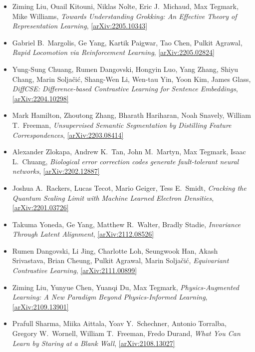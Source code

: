 \begin{itemize}
\item Ziming Liu, Ouail Kitouni, Niklas Nolte, Eric J.\  Michaud, Max Tegmark, Mike Williams, \textit{Towards Understanding Grokking: An Effective Theory of Representation Learning}, \href{https://arxiv.org/abs/2205.10343}{[arXiv:2205.10343]} 
\item Gabriel B.\  Margolis, Ge Yang, Kartik Paigwar, Tao Chen, Pulkit Agrawal, \textit{Rapid Locomotion via Reinforcement Learning}, \href{https://arxiv.org/abs/2205.02824}{[arXiv:2205.02824]} 
\item Yung-Sung Chuang, Rumen Dangovski, Hongyin Luo, Yang Zhang, Shiyu Chang, Marin Soljačić, Shang-Wen Li, Wen-tau Yin, Yoon Kim, James Glass, \textit{DiffCSE: Difference-based Contrastive Learning for Sentence Embeddings}, \href{https://arxiv.org/abs/2204.10298}{[arXiv:2204.10298]} 
\item Mark Hamilton, Zhoutong Zhang, Bharath Hariharan, Noah Snavely, William T.\  Freeman, \textit{Unsupervised Semantic Segmentation by Distilling Feature Correspondences}, \href{https://arxiv.org/abs/2203.08414}{[arXiv:2203.08414]} 
\item Alexander Zlokapa, Andrew K.\  Tan, John M.\  Martyn, Max Tegmark, Isaac L.\  Chuang, \textit{Biological error correction codes generate fault-tolerant neural networks}, \href{https://arxiv.org/abs/2202.12887}{[arXiv:2202.12887]} 
\item Joshua A.\  Rackers, Lucas Tecot, Mario Geiger, Tess E.\  Smidt, \textit{Cracking the Quantum Scaling Limit with Machine Learned Electron Densities}, \href{https://arxiv.org/abs/2201.03726}{[arXiv:2201.03726]} 
\item Takuma Yoneda, Ge Yang, Matthew R.\  Walter, Bradly Stadie, \textit{Invariance Through Latent Alignment}, \href{https://arxiv.org/abs/2112.08526}{[arXiv:2112.08526]} 
\item Rumen Dangovski, Li Jing, Charlotte Loh, Seungwook Han, Akash Srivastava, Brian Cheung, Pulkit Agrawal, Marin Soljačić, \textit{Equivariant Contrastive Learning}, \href{https://arxiv.org/abs/2111.00899}{[arXiv:2111.00899]} 
\item Ziming Liu, Yunyue Chen, Yuanqi Du, Max Tegmark, \textit{Physics-Augmented Learning: A New Paradigm Beyond Physics-Informed Learning}, \href{https://arxiv.org/abs/2109.13901}{[arXiv:2109.13901]} 
\item Prafull Sharma, Miika Aittala, Yoav Y.\  Schechner, Antonio Torralba, Gregory W.\  Wornell, William T.\  Freeman, Fredo Durand, \textit{What You Can Learn by Staring at a Blank Wall}, \href{https://arxiv.org/abs/2108.13027}{[arXiv:2108.13027]} 

\end{itemize}
